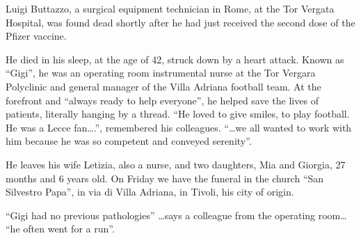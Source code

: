 Luigi Buttazzo, a surgical equipment technician in Rome, at the Tor Vergata
Hospital, was found dead shortly after he had just received the second dose of
the Pfizer vaccine.

He died in his sleep, at the age of 42, struck down by a heart attack. Known as
“Gigi”, he was an operating room instrumental nurse at the Tor Vergara
Polyclinic and general manager of the Villa Adriana football team. At the
forefront and “always ready to help everyone”, he helped save the lives of
patients, literally hanging by a thread. “He loved to give smiles, to play
football. He was a Lecce fan….”, remembered his colleagues. “…we all wanted to
work with him because he was so competent and conveyed serenity”.

He leaves his wife Letizia, also a nurse, and two daughters, Mia and Giorgia, 27
months and 6 years old. On Friday we have the funeral in the church “San
Silvestro Papa”, in via di Villa Adriana, in Tivoli, his city of origin.

“Gigi had no previous pathologies” …says a colleague from the operating room…
“he often went for a run”.

